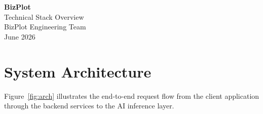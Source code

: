 \documentclass[11pt, a4paper]{article}
\begin{document}
\begin{center}
  {\Huge\bfseries\color{primary} BizPlot}\\[6pt]
  {\Large Technical Stack Overview}\\[16pt]
  {\large BizPlot Engineering Team}\\[4pt]
  {\normalsize June 2026}
\end{center}
\vspace{20pt}

\tableofcontents
\newpage


\section{System Architecture}

Figure~\ref{fig:arch} illustrates the end-to-end request flow from the
client application through the backend services to the AI inference layer.
\end{document}
